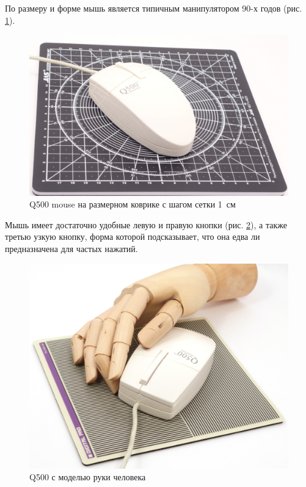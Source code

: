\documentclass[11pt, a4paper]{article}
\begin{document}
По размеру и форме мышь является типичным манипулятором 90-х годов (рис. \ref{fig:q500mouseSize}).

\begin{figure}[h]
    \centering
    \includegraphics[scale=0.25]{1996_q500_mouse/size.jpg}
    \caption{Q500 mouse на размерном коврике с шагом сетки 1~см}
    \label{fig:q500mouseSize}
\end{figure}

Мышь имеет достаточно удобные левую и правую кнопки (рис. \ref{fig:q500mouseHand}), а также третью узкую кнопку, форма которой подсказывает, что она едва ли предназначена для частых нажатий.

\begin{figure}[h]
    \centering
    \includegraphics[scale=0.4]{1996_q500_mouse/hand_30.jpg}
    \caption{Q500 с моделью руки человека}
    \label{fig:q500mouseHand}
\end{figure}
\end{document}
